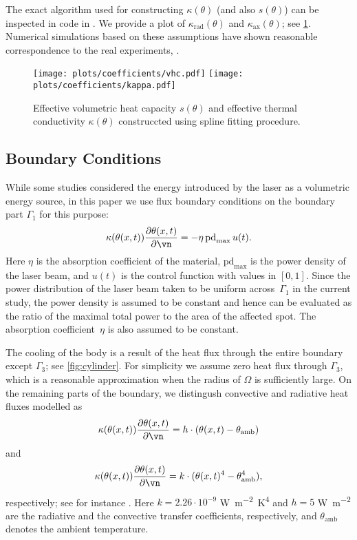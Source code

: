 The exact algorithm used for constructing $\kappa(\theta)$ (and also $s(\theta)$) can be inspected in code in \cite[\texttt{optipuls.coefficients}]{optipuls_github}. 
We provide a plot of $\kappa_\text{rad}(\theta)$ and $\kappa_\text{ax}(\theta)$; see \cref{fig:coef}.
Numerical simulations based on these assumptions have shown reasonable correspondence to the real experiments, .

\begin{figure}[ht]
	\centering
	\texttt{[image: plots/coefficients/vhc.pdf]}
	\texttt{[image: plots/coefficients/kappa.pdf]}
	\caption{Effective volumetric heat capacity $s(\theta)$ and effective thermal conductivity $\kappa(\theta)$ construccted using spline fitting procedure.}
	\label{fig:coef}
\end{figure}


\subsection{Boundary Conditions}
\label{subsec:boundary_conditions}

While some studies considered the energy introduced by the laser as a volumetric energy source, in this paper we use flux boundary conditions on the boundary part $\Gamma_1$ for this purpose:
\begin{equation}
	\kappa(\theta(x,t)) \frac{\partial \theta(x,t)}{\partial \vn} 
	= 
	- \eta \, \text{pd}_{\max} \, u(t)
	.
\end{equation}
Here $\eta$ is the absorption coefficient of the material, $\text{pd}_{\max}$ is the power density of the laser beam, and $u(t)$ is the control function with values in $[0,1]$.
Since the power distribution of the laser beam taken to be uniform across~$\Gamma_1$ in the current study, the power density is assumed to be constant and hence can be evaluated as the ratio of the maximal total power to the area of the affected spot. 
The absorption coefficient~$\eta$ is also assumed to be constant.

The cooling of the body is a result of the heat flux through the entire boundary except $\Gamma_3$; see \cref{fig:cylinder}.
For simplicity we assume zero heat flux through $\Gamma_3$, which is a reasonable approximation when the radius of $\Omega$ is sufficiently large.
On the remaining parts of the boundary, we distingush convective and radiative heat fluxes modelled as
\begin{equation}
	\kappa(\theta(x,t)) \frac{\partial \theta(x,t)}{\partial \vn} 
	= 
	h \cdot (\theta(x,t) - \theta_\text{amb})
\end{equation}
and
\begin{equation}
	\kappa(\theta(x,t)) \frac{\partial \theta(x,t)}{\partial \vn} 
	= 
	k \cdot (\theta(x,t)^4 - \theta^4_\text{amb})
	,
\end{equation}
respectively; see for instance \cite[Chapter~3]{Sluzalec:2005:1}.
Here $k = 2.26 \cdot 10^{-9}$ \si{\W\per\m^2\K^4} and $h = 5$ \si{\W\per\m^2} are the radiative and the convective transfer coefficients, respectively, and $\theta_\text{amb}$ denotes the ambient temperature.


